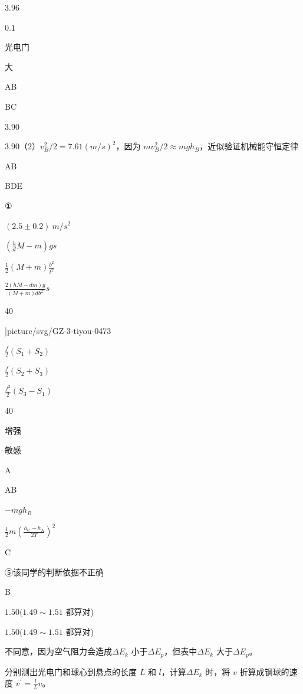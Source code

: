 \item $ 3.96 $
\item $ 0.1 $
\item \par 
\item 光电门
\item 大
\item AB
\item BC
\item $ 3.90 $
\item $ 3.90 $（$ 2 $）$ v_{B} ^{2}/2=7.61(m/s)^{2} $，因为 $ m v_{B} ^{2}/2 \approx mg h_{B} $，近似验证机械能守恒定律
\item AB
\item BDE
\item ①
\item $ (2.5 \pm 0.2) \ m/s^{2} $
\item $\left (\frac {h}{d} M-m\right ) g s$
\item $\frac {1}{2}(M+m) \frac {b^{2}}{t^{2}}$
\item $\frac {2(h M-d m) g}{(M+m) d b^{2}} s$
\item 40
\item \linewidth ]{picture/svg/GZ-3-tiyou-0473}
\item $\frac {f}{2}\left (S_{1}+S_{2}\right )$
\item $\frac {f}{2}\left (S_{2}+S_{3}\right )$
\item $\frac {f^{2}}{2}\left (S_{3}-S_{1}\right )$
\item $ 40 $
\item 增强
\item 敏感
\item A
\item AB
\item $ -mg h_{B} $
\item $\frac {1}{2} m\left (\frac {h_{\mathrm {C}}-h_{\mathrm {A}}}{2 T}\right )^{2}$
\item C
\item ⑤该同学的判断依据不正确
\item B
\item $ 1.50(1.49 \sim 1.51 $ 都算对)
\item $ 1.50(1.49 \sim 1.51 $ 都算对)
\item 不同意，因为空气阻力会造成$ \Delta E_{k} $ 小于$ \Delta E_{p} $，但表中$ \Delta E_{k} $ 大于$ \Delta E_{p} $。
\item 分别测出光电门和球心到悬点的长度 $ L $ 和 $ l $，计算$ \Delta E_{k} $ 时，将 $ v $ 折算成钢球的速度 $ v ^{\prime } =\frac {l}{L}v $。

